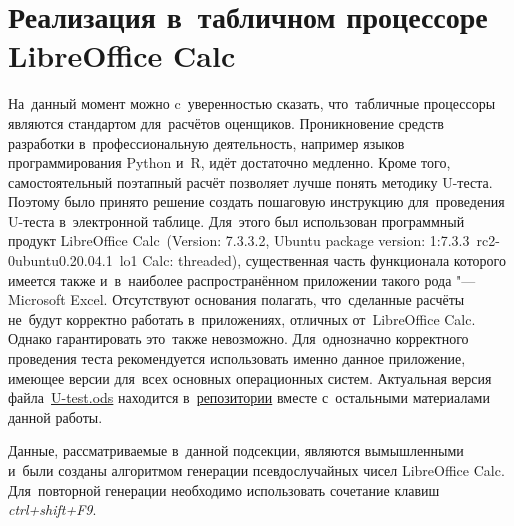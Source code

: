 \documentclass[]{scrreprt}
\begin{document}
\section{Реализация в~табличном процессоре LibreOffice Calc}\label{U-test-spreadsheet}
На~данный момент можно c~уверенностью сказать, что~табличные процессоры являются стандартом для~расчётов оценщиков. Проникновение средств разработки в~профессиональную деятельность, например языков программирования Python и~R,  идёт достаточно медленно. Кроме того, самостоятельный поэтапный расчёт позволяет лучше понять методику U-теста. Поэтому было принято решение создать пошаговую инструкцию для~проведения U-теста в~электронной таблице. Для~этого был использован программный продукт LibreOffice Calc~(Version: 7.3.3.2, Ubuntu package version: 1:7.3.3~rc2-0ubuntu0.20.04.1~lo1 Calc: threaded), существенная часть функционала которого имеется также и~в~наиболее распространённом приложении такого рода "--- \foreignlanguage{english}{Microsoft Excel}. Отсутствуют основания полагать, что~сделанные расчёты не~будут корректно работать в~приложениях, отличных от~LibreOffice Calc. Однако гарантировать это~также невозможно. Для~однозначно корректного проведения теста рекомендуется использовать именно данное приложение, имеющее версии для~всех основных операционных систем. Актуальная версия файла~\href{https://github.com/Kirill-Murashev/AI_for_valuers_book/blob/main/Parts-Chapters/Mann-Whitney-Wilcoxon/U-test.ods}{U-test.ods} находится в~\href{https://github.com/Kirill-Murashev/AI_for_valuers_book/tree/main/Parts&Chapters/Mann-Whitney-Wilcoxon}{репозитории} вместе с~остальными материалами данной работы.

Данные, рассматриваемые в~данной подсекции, являются вымышленными и~были созданы алгоритмом генерации псевдослучайных чисел LibreOffice Calc. Для~повторной генерации необходимо использовать сочетание клавиш \emph{ctrl+shift+F9}. 
\end{document}
